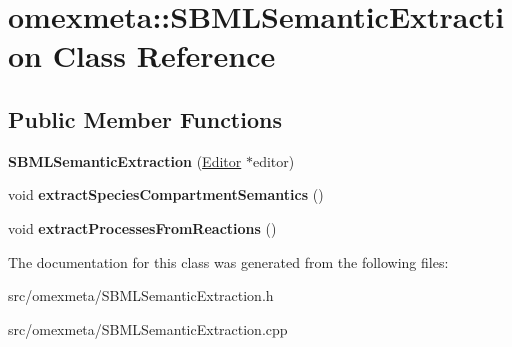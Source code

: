\hypertarget{classomexmeta_1_1SBMLSemanticExtraction}{}\section{omexmeta\+:\+:S\+B\+M\+L\+Semantic\+Extraction Class Reference}
\label{classomexmeta_1_1SBMLSemanticExtraction}
\subsection*{Public Member Functions}
\begin{DoxyCompactItemize}
\item 
\mbox{\label{classomexmeta_1_1SBMLSemanticExtraction_a3c55dab129bd47c753f19317fade1f18}} 
{\bfseries S\+B\+M\+L\+Semantic\+Extraction} (\hyperlink{classomexmeta_1_1Editor}{Editor} $\ast$editor)
\item 
\mbox{\label{classomexmeta_1_1SBMLSemanticExtraction_a53cda7f108b954af7fb1159773e44522}} 
void {\bfseries extract\+Species\+Compartment\+Semantics} ()
\item 
\mbox{\label{classomexmeta_1_1SBMLSemanticExtraction_a89ed78df066e71e628c8b631175a8441}} 
void {\bfseries extract\+Processes\+From\+Reactions} ()
\end{DoxyCompactItemize}


The documentation for this class was generated from the following files\+:\begin{DoxyCompactItemize}
\item 
src/omexmeta/S\+B\+M\+L\+Semantic\+Extraction.\+h\item 
src/omexmeta/S\+B\+M\+L\+Semantic\+Extraction.\+cpp\end{DoxyCompactItemize}
